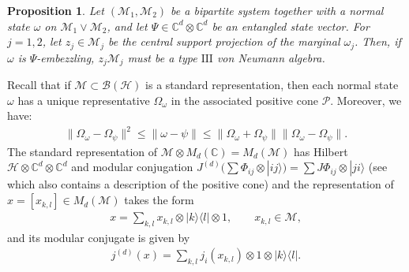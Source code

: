\documentclass[a4paper, 10pt, onecolumn, accepted=2025-07-22]{quantumarticle}
\newtheorem{proposition}[theorem]{Proposition}
\theoremstyle{definition}
\newcommand{\ket}[1]{|#1\rangle}
\newcommand{\norm}[1]{\lVert #1\rVert}
\newcommand{\ox}{\otimes}
\newcommand{\mc}{\mathcal}
\newcommand{\III}{{\mathrm{III}}}
\newcommand{\up}[1]{^{(#1)}}
\def\B{{\mc B}}
\def\CC{{\mathbb C}}
\def\H{{\mc H}}
\def\M{{\mc M}}
\renewcommand\P{\mc P}
\newcommand*{\1}{\text{\usefont{U}{bbold}{m}{n}1}}
\begin{document}
\begin{proposition}\label{prop:typeIII}
Let $(\M_1,\M_2)$ be a bipartite system together with a normal state $\omega$ on $\M_1\vee\M_2$, and let $\Psi\in\CC^d\ox\CC^d$ be an entangled state vector. For $j=1,2$, let $z_{j}\in\M_j$ be the central support projection of the marginal $\omega_{j}$.
Then, if $\omega$ is $\Psi$-embezzling, $z_{j}\M_j$ must be a type $\III$ von Neumann algebra.    
\end{proposition}

Recall that if $\M\subset \B(\H)$ is a standard representation, then each normal state $\omega$ has a unique representative $\Omega_\omega$ in the associated positive cone $\P$. 
Moreover, we have:
\begin{align}\label{eq:F-vdG}
\norm{\Omega_\omega - \Omega_\psi}^2 \leq \norm{\omega-\psi} \leq \norm{\Omega_\omega+\Omega_\psi}\norm{\Omega_\omega - \Omega_\psi}.
\end{align}
The standard representation of $\M\ox M_d(\CC) = M_d(\M)$ has Hilbert $\H \ox \CC^d \ox \CC^d$ and modular conjugation $J\up d( \sum \Phi_{ij}\ox \ket{ij} ) = \sum J\Phi_{ij} \ox \ket{ji}$ (see \cite[Lem.~2]{long_paper} which also contains a description of the positive cone) and the representation of $x=[x_{k,l}]\in M_d(\M)$ takes the form
\begin{align}
 x=   \sum_{k,l} x_{k,l} \ox |k\rangle\langle l|\ox 1,\qquad x_{k,l}\in \M,
\end{align}
and its modular conjugate is given by
\begin{align}
    j\up d(x) = \sum_{k,l}j_i(x_{k,l})\ox 1\ox |k\rangle\langle l|. 
\end{align}
\end{document}
